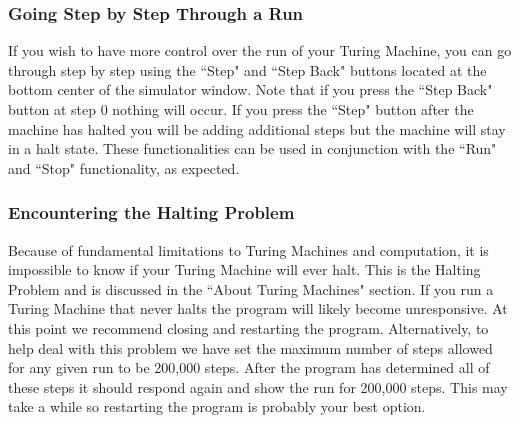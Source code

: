 \documentclass[12pt,letterpaper]{article}
\begin{document}
	\subsubsection{Going Step by Step Through a Run}
	\noindent If you wish to have more control over the run of your Turing Machine, you can go through step by step using the ``Step" and ``Step Back" buttons located at the bottom center of the simulator window. Note that if you press the ``Step Back" button at step 0 nothing will occur. If you press the ``Step" button after the machine has halted you will be adding additional steps but the machine will stay in a halt state. These functionalities can be used in conjunction with the ``Run" and ``Stop" functionality, as expected. 
	
	\subsubsection{Encountering the Halting Problem}\label{halt}
	\noindent Because of fundamental limitations to Turing Machines and computation, it is impossible to know if your Turing Machine will ever halt. This is the Halting Problem and is discussed in the ``About Turing Machines" section. If you run a Turing Machine that never halts the program will likely become unresponsive. At this point we recommend closing and restarting the program. Alternatively, to help deal with this problem we have set the maximum number of steps allowed for any given run to be 200,000 steps. After the program has determined all of these steps it should respond again and show the run for 200,000 steps. This may take a while so restarting the program is probably your best option. 
\end{document}
